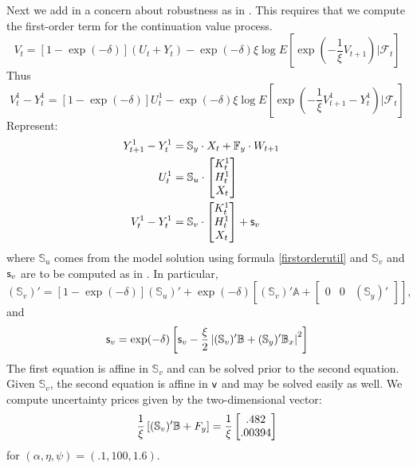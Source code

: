 \documentclass[12pt]{article}
\begin{document}
Next we add in a concern about robustness as in \cite{hst:1999}.  This requires that we compute the first-order term for the continuation value process.
\[
V_t = [1 - \exp(-\delta)]  (U_t + Y_t)   - \exp(-\delta)  \xi \log E\left[ \exp \left( - {\frac 1 \xi} V_{t+1} \right) \vert {\mathcal F}_t \right]
\]
Thus
\[
V_t^1 - Y_t^1  =  [1 - \exp(-\delta)] U_t^1  - \exp(-\delta) \xi \log E\left[ \exp \left( - {\frac 1 \xi} V_{t+1}^1 - Y_{t}^1  \right) \vert {\mathcal F}_t \right]
\]
Represent:
\begin{align*}
Y_{t+1}^1 - Y_t^1 & = {\mathbb S}_y \cdot X_t + {\mathbb F}_y \cdot W_{t+1} \cr
U_t^1  & = {\mathbb S}_u \cdot  \begin{bmatrix}  K_{t}^1 \cr H_{t}^1  \cr X_{t} \end{bmatrix} \cr
V_t^1 - Y_t^1 & = {\mathbb S}_v \cdot \begin{bmatrix}  K_{t}^1 \cr H_{t}^1  \cr X_{t} \end{bmatrix} + {\sf s}_v
\end{align*}
where ${\mathbb S}_u$ comes from the model solution using formula \eqref{firstorderutil} and ${\mathbb S}_v$ and ${\sf s}_v$ are to be computed as in \cite{hhl:2008}.  In particular,
\[
({\mathbb S}_v)' =  [1 - \exp(-\delta)] ({\mathbb S}_u)' +   \exp(-\delta) \left[ ({\mathbb S}_v)'  {\mathbb A}  + \begin{bmatrix} 0 & 0 & ({\mathbb S}_y)' \end{bmatrix} \right],
\]
and
\[
{\sf s}_v = \exp(-\delta) \left[ {\sf s}_v - {\frac \xi 2} \left \vert  ({\mathbb S}_v)' {\mathbb B} + ({\mathbb S}_y)' {\mathbb B}_x  \right \vert^2 \right]
\]
The first equation is affine in ${\mathbb S}_v$ and can be solved prior to the second equation.  Given ${\mathbb S}_v$, the second equation is affine in ${\sf v}$ and may be solved easily as well.  We compute uncertainty prices given by the two-dimensional vector:
\[
{\frac 1 \xi} \left[ ({\mathbb S}_v)'{\mathbb B}  + F_y \right] = {\frac 1 \xi} \begin{bmatrix} .482 \cr .00394 \end{bmatrix}
\]
for $(\alpha, \eta, \psi) = (.1, 100, 1.6)$.
\end{document}
